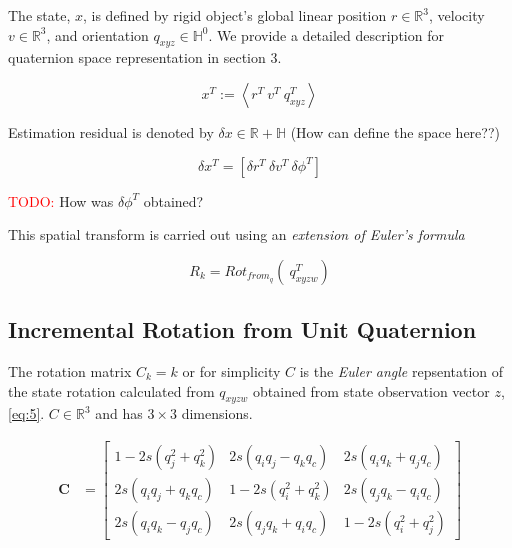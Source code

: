 \documentclass[letterpaper, 10 pt, conference]{ieeeconf}  %
\newcommand{\transpose}[1]{\ensuremath{#1^{\scriptscriptstyle T}}}
\begin{document}
The state, $x$, is defined by rigid object's global linear position
\(r \in \mathbb{R}^3\), velocity
\(v \in \mathbb{R}^3\), and orientation $q_{xyz} \in \mathbb{H}^0$.
We provide a detailed description for quaternion space representation in section 3.

\begin{equation}
\label{eq:8}
\transpose{x} :=  \left<\transpose{r}~\transpose{v}~\transpose{q_{xyz}} \right>
\end{equation}


Estimation residual is denoted by $\delta x \in \mathbb{R + H}$  (How can define the space here??)


\begin{equation}
\label{eq:10}
\delta \transpose{x} = \left[\transpose{\delta r} ~\transpose{\delta v} ~\transpose{\delta \phi} \right]
\end{equation}

\textcolor{red}{TODO:} How was $ \transpose{\delta \phi} $ obtained?




This spatial transform is carried out using an \textit{extension of Euler's formula}

\begin{equation}
\label{eq:11}
R_{k} = Rot_{from_q} \left( ~\transpose{q_{xyzw} } \right)
\end{equation}




\subsection{Incremental Rotation from Unit Quaternion}
The rotation matrix \(C_k={k}\) or for simplicity \(C\) is the \textit{Euler angle}
repsentation of the state rotation calculated from \(q_{xyzw}\) obtained from
state observation vector $z$, \ref{eq:5}. \(C \in \mathbb{R}^3\) and has \(3 \times 3\) dimensions.

\begin{equation}
\begin{aligned}
\mathbf{C} &=
{\begin{bmatrix}
        1-2s(q_{j}^{2}+q_{k}^{2})&2s(q_{i}q_{j}-q_{k}q_{c})&2s(q_{i}q_{k}+q_{j}q_{c})\\
        2s(q_{i}q_{j}+q_{k}q_{c})&1-2s(q_{i}^{2}+q_{k}^{2})&2s(q_{j}q_{k}-q_{i}q_{c})\\
        2s(q_{i}q_{k}-q_{j}q_{c})&2s(q_{j}q_{k}+q_{i}q_{c})&1-2s(q_{i}^{2}+q_{j}^{2})
\end{bmatrix}}
\end{aligned}
\end{equation}
\end{document}
